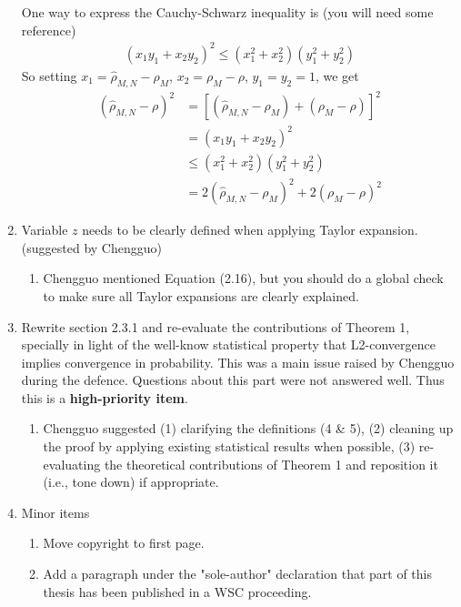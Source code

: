 \documentclass[letterpaper]{article}
\begin{document}
\begin{enumerate}
    One way to express the Cauchy-Schwarz inequality is (you will need some reference)
    \begin{align*}
        (x_1y_1 + x_2y_2)^2 \leq (x_1^2 +x_2^2)(y_1^2 +y_2^2)
    \end{align*}
    So setting $x_1 = \hat{\rho}_{M,N}-\rho_M$, $x_2 = \rho_M-\rho$, $y_1=y_2=1$, we get
    \begin{align*}
        (\hat{\rho}_{M,N}-\rho)^2 &= [(\hat{\rho}_{M,N}-\rho_M) + (\rho_M-\rho)]^2\\
        &= (x_1y_1 + x_2y_2)^2 \\
        &\leq (x_1^2+x_2^2)(y_1^2+y_2^2)\\
        &=2(\hat{\rho}_{M,N}-\rho_M)^2 + 2(\rho_M-\rho)^2
    \end{align*}

    \item Variable $z$ needs to be clearly defined when applying Taylor expansion. (suggested by Chengguo)
    \begin{enumerate}
        \item Chengguo mentioned Equation (2.16), but you should do a global check to make sure all Taylor expansions are clearly explained.
    \end{enumerate}

    \item Rewrite section 2.3.1 and re-evaluate the contributions of Theorem 1, specially in light of the well-know statistical property that L2-convergence implies convergence in probability. This was a main issue raised by Chengguo during the defence. Questions about this part were not answered well. Thus this is a \textbf{high-priority item}. 
    \begin{enumerate}
        \item Chengguo suggested (1) clarifying the definitions (4 \& 5), (2) cleaning up the proof by applying existing statistical results when possible, (3) re-evaluating the theoretical contributions of Theorem 1 and reposition it (i.e., tone down) if appropriate.
    \end{enumerate}
    
    \item Minor items
    \begin{enumerate}
        \item Move copyright to first page.
        \item Add a paragraph under the "sole-author" declaration that part of this thesis has been published in a WSC proceeding.
    \end{enumerate}
\end{enumerate}
    
\end{document}
